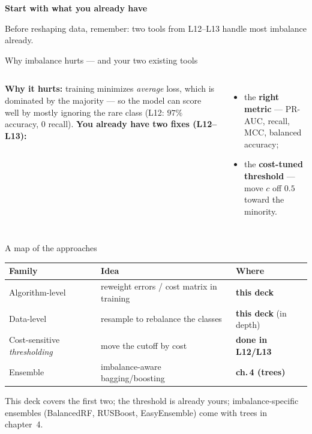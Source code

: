 \documentclass[aspectratio=169]{beamer}
\begin{document}
\begin{frame}[plain]
  \vfill
  \begin{center}
    {\Large\color{popblue}\textbf{Start with what you already have}}\\[0.9em]
    \begin{minipage}{0.82\textwidth}\centering\small
      Before reshaping data, remember: two tools from L12--L13 handle most imbalance already.
    \end{minipage}
  \end{center}
  \vfill
\end{frame}

\begin{frame}{Why imbalance hurts --- and your two existing tools}
  \begin{columns}[T]
    \textbf{Why it hurts:} training minimizes \emph{average} loss, which is dominated by the
    majority --- so the model can score well by mostly ignoring the rare class (L12: $97\%$
    accuracy, $0$ recall).
    \textbf{You already have two fixes (L12--L13):}
    \begin{itemize}\small
      \item the \textbf{right metric} --- PR-AUC, recall, MCC, balanced accuracy;
      \item the \textbf{cost-tuned threshold} --- move $c$ off $0.5$ toward the minority.
    \end{itemize}
  \end{columns}
  \vfill
\end{frame}

\begin{frame}{A map of the approaches}
  \begin{center}\small
    \renewcommand{\arraystretch}{1.3}
    \begin{tabular}{l l l}
      \textbf{Family} & \textbf{Idea} & \textbf{Where} \\
      \hline
      Algorithm-level & reweight errors / cost matrix in training & \textbf{this deck} \\
      Data-level & resample to rebalance the classes & \textbf{this deck} (in depth) \\
      Cost-sensitive \emph{thresholding} & move the cutoff by cost & \textbf{done in L12/L13} \\
      Ensemble & imbalance-aware bagging/boosting & \textbf{ch.\,4 (trees)} \\
      \hline
    \end{tabular}
  \end{center}
  \vfill
  \footnotesize This deck covers the first two; the threshold is already yours; imbalance-specific
  ensembles (BalancedRF, RUSBoost, EasyEnsemble) come with trees in chapter~4.
\end{frame}
\end{document}
